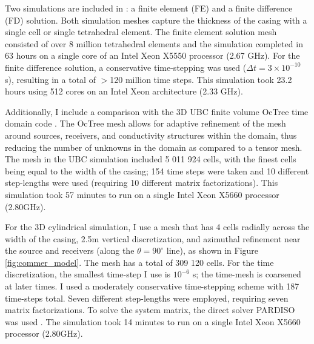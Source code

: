 Two simulations are included in \cite{Commer2015}: a finite element (FE) and a finite difference (FD) solution. Both simulation meshes capture the thickness of the casing with a single cell or single tetrahedral element. The finite element solution mesh consisted of over 8 million tetrahedral elements and the simulation completed in 63 hours on a single core of an Intel Xeon X5550 processor (2.67 GHz). For the finite difference solution, a conservative time-stepping was used ($\Delta t = 3 \times 10^{-10}$ s), resulting in a total of $>$120 million time steps. This simulation took 23.2 hours using 512 cores on an Intel Xeon architecture (2.33 GHz).

Additionally, I include a comparison with the 3D UBC finite volume OcTree time domain code \citep{Haber2007}. The OcTree mesh allows for adaptive refinement of the mesh around sources, receivers, and conductivity structures within the domain, thus reducing the number of unknowns in the domain as compared to a tensor mesh. The mesh in the UBC simulation included 5 011 924 cells, with the finest cells being equal to the width of the casing; 154 time steps were taken and 10 different step-lengths were used (requiring 10 different matrix factorizations). This simulation took 57 minutes to run on a single Intel Xeon X5660 processor (2.80GHz).

For the 3D cylindrical simulation, I use a mesh that has 4 cells radially across the width of the casing, 2.5m vertical discretization, and azimuthal refinement near the source and receivers (along the $\theta=90^\circ$ line), as shown in Figure \ref{fig:commer_model}. The mesh has a total of 309 120 cells. For the time discretization, the smallest time-step I use is $10^{-6}$ s; the time-mesh is coarsened at later times. I used a moderately conservative time-stepping scheme with 187 time-steps total. Seven different step-lengths were employed, requiring seven matrix factorizations. To solve the system matrix, the direct solver PARDISO was used \citep{Petra2014, Cosmin2016}. The simulation took 14 minutes to run on a single Intel Xeon X5660 processor (2.80GHz).






